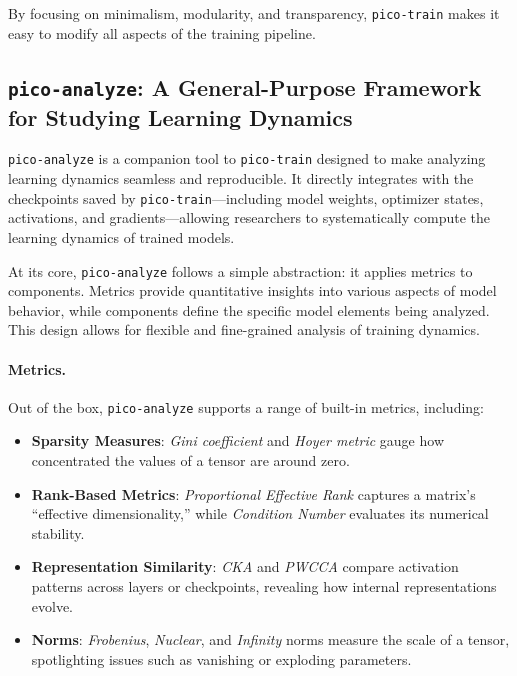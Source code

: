 By focusing on minimalism, modularity, and transparency, \texttt{pico-train} makes it easy to modify all aspects of the training pipeline. 

\subsection{\texttt{pico-analyze}: A General-Purpose Framework for Studying Learning Dynamics}

\texttt{pico-analyze} is a companion tool to \texttt{pico-train} designed to make analyzing learning dynamics seamless and reproducible. It directly integrates with the checkpoints saved by \texttt{pico-train}—including model weights, optimizer states, activations, and gradients—allowing researchers to systematically compute the learning dynamics of trained models.

At its core, \texttt{pico-analyze} follows a simple abstraction: it applies metrics to components. Metrics provide quantitative insights into various aspects of model behavior, while components define the specific model elements being analyzed. This design allows for flexible and fine-grained analysis of training dynamics.

\paragraph{Metrics.} Out of the box, \texttt{pico-analyze} supports a range of built-in metrics, including:
\begin{itemize}
    \item \textbf{Sparsity Measures}: \textit{Gini coefficient} \citep{hurley2009gini} and \textit{Hoyer metric} \citep{hoyer2004sparsity} gauge how concentrated the values of a tensor are around zero.

    \item \textbf{Rank-Based Metrics}: \textit{Proportional Effective Rank} \citep{diehlmartinez2024tending} captures a matrix’s “effective dimensionality,” while \textit{Condition Number} evaluates its numerical stability.

    \item \textbf{Representation Similarity}: \textit{CKA} \citep{kornblith2019cka} and \textit{PWCCA} \citep{morcos2018pwcca} compare activation patterns across layers or checkpoints, revealing how internal representations evolve.
    
    \item \textbf{Norms}: \textit{Frobenius}, \textit{Nuclear}, and \textit{Infinity} norms measure the scale of a tensor, spotlighting issues such as vanishing or exploding parameters.
\end{itemize}

